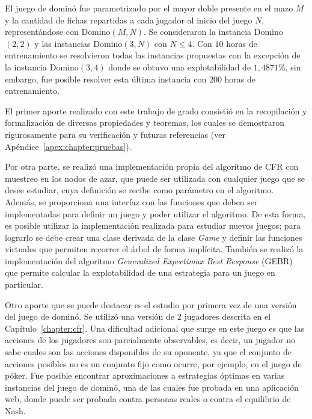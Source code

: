 El juego de dominó fue parametrizado por el mayor doble presente en el mazo $M$ y la cantidad de fichas repartidas a cada jugador al inicio del juego $N$, representándose con Domino$(M, N)$. Se consideraron la instancia Domino$(2, 2)$ y las instancias Domino$(3, N)$ con $N \leq 4$. Con $10$ horas de entrenamiento se resolvieron todas las instancias propuestas con la excepción de la instancia Domino$(3, 4)$ donde se obtuvo una explotabilidad de $1,4871\%$, sin embargo, fue posible resolver esta última instancia con $200$ horas de entrenamiento.

El primer aporte realizado con este trabajo de grado consistió en la recopilación y formalización de diversas propiedades y teoremas, los cuales se demostraron rigurosamente para su verificación y futuras referencias (ver Apéndice~\ref{apex:chapter:pruebas}).

Por otra parte, se realizó una implementación propia del algoritmo de CFR con muestreo en los nodos de azar, que puede ser utilizada con cualquier juego que se desee estudiar, cuya definición se recibe como parámetro en el algoritmo. Además, se proporciona una interfaz con las funciones que deben ser implementadas para definir un juego y poder utilizar el algoritmo. De esta forma, es posible utilizar la implementación realizada para estudiar nuevos juegos; para lograrlo se debe crear una clase derivada de la clase \textit{Game} y definir las funciones virtuales que permiten recorrer el árbol de forma implícita. También se realizó la implementación del algoritmo \textit{Generalized Expectimax Best Response} (GEBR) que permite calcular la explotabilidad de una estrategia para un juego en particular.

Otro aporte que se puede destacar es el estudio por primera vez de una versión del juego de dominó. Se utilizó una versión de $2$ jugadores descrita en el Capítulo~\ref{chapter:cfr}. Una dificultad adicional que surge en este juego es que las acciones de los jugadores son parcialmente observables, es decir, un jugador no sabe cuales son las acciones disponibles de su oponente, ya que el conjunto de acciones posibles no es un conjunto fijo como ocurre, por ejemplo, en el juego de póker. Fue posible encontrar aproximaciones a estrategias óptimas en varias instancias del juego de dominó, una de las cuales fue probada en una aplicación web, donde puede ser probada contra personas reales o contra el equilibrio de Nash.

